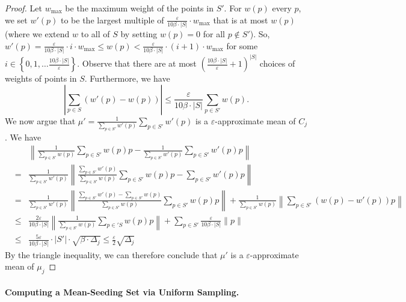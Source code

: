 \documentclass[10pt,a4paper]{amsart}
\begin{document}
\begin{proof}
Let $w_{\max}$ be the maximum weight of the points in $S'$. For $w(p)$ every $p$, we set $w'(p)$ to be the largest multiple of $\frac{\varepsilon}{10\beta\cdot |S|}\cdot w_{\max}$ that is
at most $w(p)$ (where we extend $w$ to all of $S$ by setting $w(p)=0$ for all $p\not\in S'$). So,
$w'(p) = \frac{\varepsilon}{10\beta\cdot |S|}\cdot i \cdot w_{\max} \leq w(p)< \frac{\varepsilon}{10\beta\cdot |S|}\cdot (i+1) \cdot w_{\max} $ for some $i\in \left\{0,1,\ldots \frac{10\beta\cdot |S|}{\varepsilon}\right\}$. Observe that there are at most $\left(\frac{10\beta\cdot |S|}{\varepsilon}+1\right)^{|S|}$
choices of weights of points in $S$.
Furthermore, we have
$$
\left\vert\sum_{p\in S}\left(w'(p)-w(p)\right)\right\vert \leq \frac{\varepsilon}{10\beta\cdot |S|}\sum_{p\in S'}w(p).
$$
We now argue that $\mu' = \frac{1}{\sum_{p\in S'}w'(p)}\sum_{p\in S'} w'(p)$ is a $\varepsilon$-approximate mean of $C_j$.
We have
\begin{eqnarray*}
    & & \left\|\frac{1}{\sum_{p\in S'}w(p)}\sum_{p\in S'}w(p)p - \frac{1}{\sum_{p\in S'}w'(p)}\sum_{p\in S'}w'(p)p\right\| \\
    &=& \frac{1}{\sum_{p\in S'}w'(p)}\left\|\frac{\sum_{p\in S'}w'(p)}{\sum_{p\in S'}w(p)}\sum_{p\in S'}w(p)p - \sum_{p\in S'}w'(p)p\right\| \\
    &=& \frac{1}{\sum_{p\in S'}w'(p)}\left\|\frac{\sum_{p\in S'}w'(p)-\sum_{p\in S'}w(p)}{\sum_{p\in S'}w(p)}\sum_{p\in S'}w(p)p\right\| + \frac{1}{\sum_{p\in S'}w(p)}\left\|\sum_{p\in S'}(w(p)-w'(p))p\right\|\\
    &\leq & \frac{2\varepsilon}{10\beta\cdot |S|}\left\|\frac{1}{\sum_{p\in S'}w(p)}\sum_{p\in 'S}w(p)p\right\| + \sum_{p\in S'} \frac{\varepsilon}{10\beta\cdot |S|}\|p\| \\
    &\leq & \frac{5\varepsilon}{10\beta\cdot |S|} \cdot |S'| \cdot \sqrt{\beta\cdot \Delta_j} \leq \frac{\varepsilon}{2} \sqrt{\Delta_j}
\end{eqnarray*}
By the triangle inequality, we can therefore conclude that $\mu'$ is a $\varepsilon$-approximate mean of $\mu_j$
\end{proof}



\paragraph{Computing a Mean-Seeding Set via Uniform Sampling.}
\end{document}
